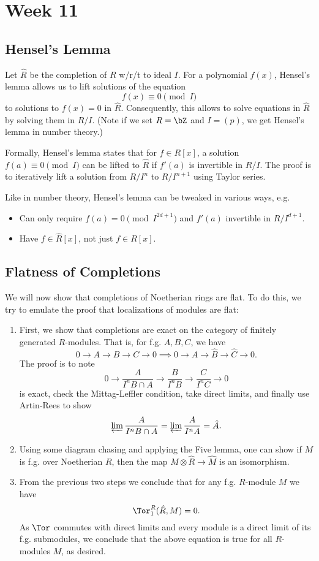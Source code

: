 \section{Week 11}

\subsection{Hensel's Lemma}
Let $\hat{R}$ be the completion of $R$ w/r/t to ideal $I$. For a polynomial $f(x)$, Hensel's lemma allows us to lift solutions of the equation
\[
    f(x) \equiv 0 \pmod{I}
\]
to solutions to $f(x) = 0$ in $\hat{R}$. Consequently, this allows to solve equations in $\hat{R}$ by solving them in $R/I$. (Note if we set $R = \bZ$ and $I = (p)$, we get Hensel's lemma in number theory.)

Formally, Hensel's lemma states that for $f \in R[x]$, a solution $f(a) \equiv 0 \pmod{I}$ can be lifted to $\hat{R}$ if $f'(a)$ is invertible in $R/I$. The proof is to iteratively lift a solution from $R/I^n$ to $R/I^{n+1}$ using Taylor series.

Like in number theory, Hensel's lemma can be tweaked in various ways, e.g.
\begin{itemize}
    \item Can only require $f(a) = 0 \pmod{I^{2d+1}}$ and $f'(a)$ invertible in $R/I^{d+1}$.
    \item Have $f \in \hat{R}[x]$, not just $f \in R[x]$.
\end{itemize}

\subsection{Flatness of Completions}
We will now show that completions of Noetherian rings are flat. To do this, we try to emulate the proof that localizations of modules are flat:
\begin{enumerate}
    \item First, we show that completions are exact on the category of finitely generated $R$-modules. That is, for f.g. $A, B, C$, we have
    \[
        0 \to A \to B \to C \to 0 \implies 0 \to \hat{A} \to \hat{B} \to \hat{C} \to 0.
    \]
    The proof is to note
    \[
        0 \to \frac{A}{I^nB \cap A} \to \frac{B}{I^nB} \to \frac{C}{I^nC} \to 0
    \]
    is exact, check the Mittag-Leffler condition, take direct limits, and finally use Artin-Rees to show
    \[
        \varprojlim \frac{A}{I^nB \cap A} = \varprojlim \frac{A}{I^nA} = \hat{A}.
    \]
    \item Using some diagram chasing and applying the Five lemma, one can show if $M$ is f.g. over Noetherian $R$, then the map $M \otimes \hat{R} \to \hat{M}$ is an isomorphism.
    \item From the previous two steps we conclude that for any f.g. $R$-module $M$ we have
    \[
        \Tor_1^R(\hat{R}, M) = 0.
    \]
    As $\Tor$ commutes with direct limits and every module is a direct limit of its f.g. submodules, we conclude that the above equation is true for all $R$-modules $M$, as desired.
\end{enumerate}

